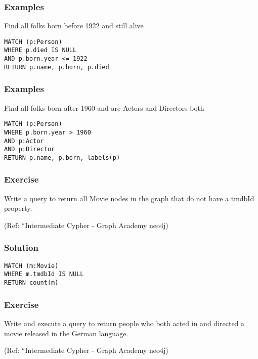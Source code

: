 \begin{frame}[fragile]\frametitle{Examples}

Find all folks born before 1922 and still alive

\begin{lstlisting}
MATCH (p:Person)
WHERE p.died IS NULL
AND p.born.year <= 1922
RETURN p.name, p.born, p.died
\end{lstlisting}	

\end{frame}

\begin{frame}[fragile]\frametitle{Examples}

Find all folks born after 1960 and are Actors and Directors both

\begin{lstlisting}
MATCH (p:Person)
WHERE p.born.year > 1960
AND p:Actor
AND p:Director
RETURN p.name, p.born, labels(p)
\end{lstlisting}	

\end{frame}

\begin{frame}[fragile]\frametitle{Exercise}

Write a query to return all Movie nodes in the graph that do not have a tmdbId property.


{\tiny (Ref: ``Intermediate Cypher - Graph Academy neo4j)}
\end{frame}

\begin{frame}[fragile]\frametitle{Solution}


\begin{lstlisting}
MATCH (m:Movie)
WHERE m.tmdbId IS NULL
RETURN count(m)
\end{lstlisting}	

\end{frame}


\begin{frame}[fragile]\frametitle{Exercise}

Write and execute a query to return people who both acted in and directed a movie released in the German language.

{\tiny (Ref: ``Intermediate Cypher - Graph Academy neo4j)}
\end{frame}

